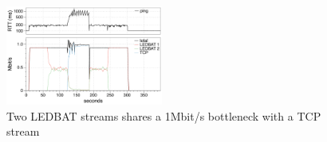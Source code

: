 \documentclass{sig-alternate}
\begin{document}





\begin{figure}[t]
  \centering
    \includegraphics[width=0.46\textwidth]{figs/2ledbat_tcp}
\vspace*{-0.38cm}
	\caption{Two LEDBAT streams shares a 1Mbit/s bottleneck with a TCP stream} \label{fig:2ledbat_tcp}
\vspace*{-0.4cm}
\end{figure}

\end{document}
